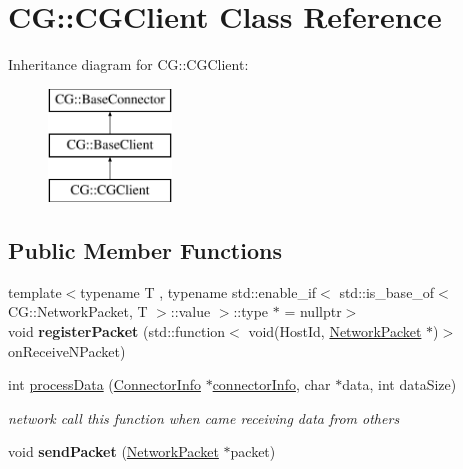 \hypertarget{class_c_g_1_1_c_g_client}{}\section{CG\+:\+:C\+G\+Client Class Reference}
\label{class_c_g_1_1_c_g_client}
Inheritance diagram for CG\+:\+:C\+G\+Client\+:\begin{figure}[H]
\begin{center}
\leavevmode
\includegraphics[height=3.000000cm]{class_c_g_1_1_c_g_client}
\end{center}
\end{figure}
\subsection*{Public Member Functions}
\begin{DoxyCompactItemize}
\item 
\mbox{\label{class_c_g_1_1_c_g_client_a30a46e32bff3f67e1c7c23b70ca39963}} 
{\footnotesize template$<$typename T , typename std\+::enable\+\_\+if$<$ std\+::is\+\_\+base\+\_\+of$<$ C\+G\+::\+Network\+Packet, T $>$\+::value $>$\+::type $\ast$  = nullptr$>$ }\\void {\bfseries register\+Packet} (std\+::function$<$ void(Host\+Id, \mbox{\hyperlink{class_c_g_1_1_network_packet}{Network\+Packet}} $\ast$)$>$ on\+Receive\+N\+Packet)
\item 
int \mbox{\hyperlink{class_c_g_1_1_c_g_client_a88087f4fdc6e07c8a252d9abe67d9f8b}{process\+Data}} (\mbox{\hyperlink{class_c_g_1_1_connector_info}{Connector\+Info}} $\ast$\mbox{\hyperlink{class_c_g_1_1_base_connector_ae68321ba56404549f2e655238035ed8d}{connector\+Info}}, char $\ast$data, int data\+Size)
\begin{DoxyCompactList}\small\item\em network call this function when came receiving data from others \end{DoxyCompactList}\item 
\mbox{\label{class_c_g_1_1_c_g_client_a6a550e4c1d5143655d54e4acece405f2}} 
void {\bfseries send\+Packet} (\mbox{\hyperlink{class_c_g_1_1_network_packet}{Network\+Packet}} $\ast$packet)
\end{DoxyCompactItemize}
